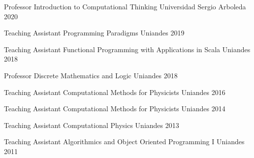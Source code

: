 


\begin{cvteachings}

    \cvteaching
    {Professor}
    {Introduction to Computational Thinking}
    {Universidad Sergio Arboleda}
    {2020}

    \cvteaching
    {Teaching Assistant}
    {Programming Paradigms}
    {Uniandes}
    {2019}

    \cvteaching
    {Teaching Assistant}
    {Functional Programming with Applications in Scala}
    {Uniandes}
    {2018}

    \cvteaching
    {Professor}
    {Discrete Mathematics and Logic}
    {Uniandes}
    {2018}

    \cvteaching
    {Teaching Assistant} %
    {Computational Methods for Physicists} %
    {Uniandes} %
    {2016} %




    \cvteaching
    {Teaching Assistant} %
    {Computational Methods for Physicists} %
    {Uniandes} %
    {2014} %

    \cvteaching
    {Teaching Assistant} %
    {Computational Physics} %
    {Uniandes} %
    {2013} %

    \cvteaching
    {Teaching Assistant} %
    {Algorithmics and Object Oriented Programming I} %
    {Uniandes} %
    {2011} %

\end{cvteachings}
